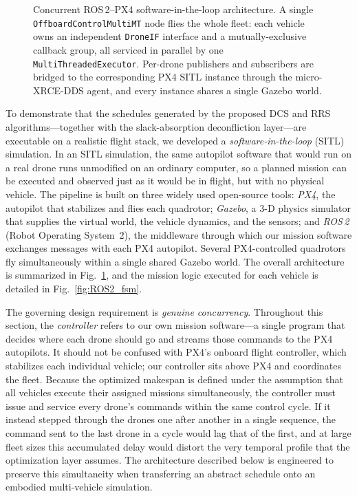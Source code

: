 \documentclass[subscriptcorrection,upint,nolists, varvw,barcolor=Goldenrod3,mathalfa=cal=euler,balance,hyphenate,french]{asmejour} %
\begin{document}
\begin{figure}[!ht]
{}
    \caption{Concurrent ROS\,2--PX4 software-in-the-loop architecture. A single \texttt{OffboardControlMultiMT} node flies the whole fleet: each vehicle owns an independent \texttt{DroneIF} interface and a mutually-exclusive callback group, all serviced in parallel by one \texttt{MultiThreadedExecutor}. Per-drone publishers and subscribers are bridged to the corresponding PX4 SITL instance through the micro-XRCE-DDS agent, and every instance shares a single Gazebo world.}
    \label{fig:ROS2_arch}
\end{figure}

To demonstrate that the schedules generated by the proposed DCS and RRS algorithms---together with the slack-absorption deconfliction layer---are executable on a realistic flight stack, we developed a \emph{software-in-the-loop} (SITL) simulation. In an SITL simulation, the same autopilot software that would run on a real drone runs unmodified on an ordinary computer, so a planned mission can be executed and observed just as it would be in flight, but with no physical vehicle. The pipeline is built on three widely used open-source tools: \emph{PX4}, the autopilot that stabilizes and flies each quadrotor; \emph{Gazebo}, a 3-D physics simulator that supplies the virtual world, the vehicle dynamics, and the sensors; and \emph{ROS\,2} (Robot Operating System~2), the middleware through which our mission software exchanges messages with each PX4 autopilot. Several PX4-controlled quadrotors fly simultaneously within a single shared Gazebo world. The overall architecture is summarized in Fig.~\ref{fig:ROS2_arch}, and the mission logic executed for each vehicle is detailed in Fig.~\ref{fig:ROS2_fsm}.

The governing design requirement is \emph{genuine concurrency}. Throughout this section, the \emph{controller} refers to our own mission software---a single program that decides where each drone should go and streams those commands to the PX4 autopilots. It should not be confused with PX4's onboard flight controller, which stabilizes each individual vehicle; our controller sits above PX4 and coordinates the fleet. Because the optimized makespan is defined under the assumption that all vehicles execute their assigned missions simultaneously, the controller must issue and service every drone's commands within the same control cycle. If it instead stepped through the drones one after another in a single sequence, the command sent to the last drone in a cycle would lag that of the first, and at large fleet sizes this accumulated delay would distort the very temporal profile that the optimization layer assumes. The architecture described below is engineered to preserve this simultaneity when transferring an abstract schedule onto an embodied multi-vehicle simulation.
\end{document}
